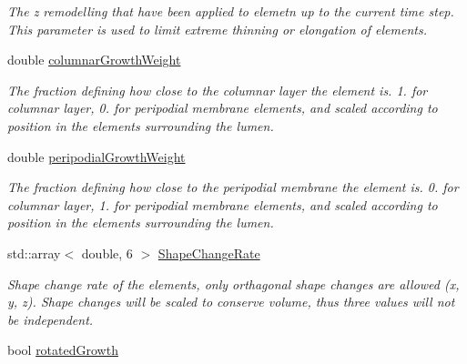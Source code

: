 \begin{DoxyCompactItemize}
\begin{DoxyCompactList}\small\item\em The z remodelling that have been applied to elemetn up to the current time step. This parameter is used to limit extreme thinning or elongation of elements. \end{DoxyCompactList}\item 
\hypertarget{classShapeBase_a134d82ba500ef829b6aa3e3a83783c9a}{}double \hyperlink{classShapeBase_a134d82ba500ef829b6aa3e3a83783c9a}{columnar\+Growth\+Weight}\label{classShapeBase_a134d82ba500ef829b6aa3e3a83783c9a}

\begin{DoxyCompactList}\small\item\em The fraction defining how close to the columnar layer the element is. 1. for columnar layer, 0. for peripodial membrane elements, and scaled according to position in the elements surrounding the lumen. \end{DoxyCompactList}\item 
\hypertarget{classShapeBase_a3663f3220016756b1bd5a92477325ec2}{}double \hyperlink{classShapeBase_a3663f3220016756b1bd5a92477325ec2}{peripodial\+Growth\+Weight}\label{classShapeBase_a3663f3220016756b1bd5a92477325ec2}

\begin{DoxyCompactList}\small\item\em The fraction defining how close to the peripodial membrane the element is. 0. for columnar layer, 1. for peripodial membrane elements, and scaled according to position in the elements surrounding the lumen. \end{DoxyCompactList}\item 
\hypertarget{classShapeBase_acb3b7ef81761fc22f3bad866570f3d13}{}std\+::array$<$ double, 6 $>$ \hyperlink{classShapeBase_acb3b7ef81761fc22f3bad866570f3d13}{Shape\+Change\+Rate}\label{classShapeBase_acb3b7ef81761fc22f3bad866570f3d13}

\begin{DoxyCompactList}\small\item\em Shape change rate of the elements, only orthagonal shape changes are allowed (x, y, z). Shape changes will be scaled to conserve volume, thus three values will not be independent. \end{DoxyCompactList}\item 
\hypertarget{classShapeBase_aee6a2cd267d49404f5442a48c867860f}{}bool \hyperlink{classShapeBase_aee6a2cd267d49404f5442a48c867860f}{rotated\+Growth}\label{classShapeBase_aee6a2cd267d49404f5442a48c867860f}


\end{DoxyCompactItemize}
